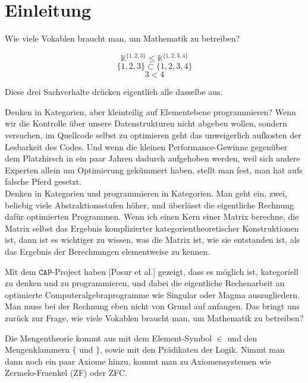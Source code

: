 
\section{Einleitung}

Wie viele Vokablen braucht man, um Mathematik zu betreiben?

\[ \mathbb{K}^{\{1,2,3\}} \leq \mathbb{K}^{\{1,2,3,4\}} \]
\[ \{1,2,3\} \subset \{1,2,3,4\} \]
\[ 3 < 4 \]

Diese drei Sachverhalte drücken eigentlich alle dasselbe aus.



Denken in Kategorien, aber kleinteilig auf Elementebene programmieren? Wenn wir die Kontrolle über unsere Datenstrukturen nicht abgeben wollen,
sondern versuchen, im Quellcode selbst zu optimieren geht das unweigerlich aufkosten der Lesbarkeit des Codes. Und wenn die kleinen Performance-Gewinne gegenüber dem Platzhirsch in ein paar Jahren dadurch aufgehoben werden, weil sich andere Experten allein um Optimierung gekümmert haben, stellt man fest,
man hat aufs falsche Pferd gesetzt.\\
Denken in Kategorien und programmieren in Kategorien. Man geht ein, zwei, beliebig viele Abstraktionsstufen höher, und überlässt die eigentliche Rechnung
dafür optimierten Programmen. Wenn ich einen Kern einer Matrix berechne, die Matrix selbst das Ergebnis komplizierter kategorientheoretischer Konstruktionen
ist, dann ist es wichtiger zu wissen, was die Matrix ist, wie sie entstanden ist, als das Ergebnis der Berechnungen elementweise zu kennen.

Mit dem $\mathtt{CAP}$-Project haben [Posur et al.] gezeigt, dass es möglich ist, kategoriell zu denken und zu programmieren, und dabei die eigentliche
Rechenarbeit an optimierte Computeralgebraprogramme wie Singular oder Magma auszugliedern. Man muss bei der Rechnung eben nicht von Grund auf
anfangen. Das bringt uns zurück zur Frage, wie viele Vokablen braucht man, um Mathematik zu betreiben?

Die Mengentheorie kommt aus mit dem Element-Symbol $\in$ und den Mengenklammern $\{$ und $\}$, sowie mit den
Prädikaten der Logik. Nimmt man dann noch ein paar Axiome hinzu, kommt man zu Axiomensystemen wie Zermelo-Fraenkel (ZF) oder ZFC.